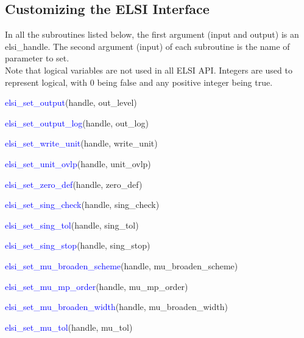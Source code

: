 \documentclass{report}
\begin{document}
\subsection{Customizing the ELSI Interface}
\label{subsec:setter_elsi}
In all the subroutines listed below, the first argument (input and output) is an elsi\_handle.  The second argument (input) of each subroutine is the name of parameter to set.\\

Note that logical variables are not used in all ELSI API.  Integers are used to represent logical, with 0 being false and any positive integer being true.

\begin{labeling}{\hspace{6cm}}
\item [\hspace{0.3cm} \textcolor{blue}{elsi\_set\_output}(handle, out\_level)]
\item [\hspace{0.3cm} \textcolor{blue}{elsi\_set\_output\_log}(handle, out\_log)]
\item [\hspace{0.3cm} \textcolor{blue}{elsi\_set\_write\_unit}(handle, write\_unit)]
\item [\hspace{0.3cm} \textcolor{blue}{elsi\_set\_unit\_ovlp}(handle, unit\_ovlp)]
\item [\hspace{0.3cm} \textcolor{blue}{elsi\_set\_zero\_def}(handle, zero\_def)]
\item [\hspace{0.3cm} \textcolor{blue}{elsi\_set\_sing\_check}(handle, sing\_check)]
\item [\hspace{0.3cm} \textcolor{blue}{elsi\_set\_sing\_tol}(handle, sing\_tol)]
\item [\hspace{0.3cm} \textcolor{blue}{elsi\_set\_sing\_stop}(handle, sing\_stop)]
\item [\hspace{0.3cm} \textcolor{blue}{elsi\_set\_mu\_broaden\_scheme}(handle, mu\_broaden\_scheme)]
\item [\hspace{0.3cm} \textcolor{blue}{elsi\_set\_mu\_mp\_order}(handle, mu\_mp\_order)]
\item [\hspace{0.3cm} \textcolor{blue}{elsi\_set\_mu\_broaden\_width}(handle, mu\_broaden\_width)]
\item [\hspace{0.3cm} \textcolor{blue}{elsi\_set\_mu\_tol}(handle, mu\_tol)]
\end{labeling}
\end{document}
